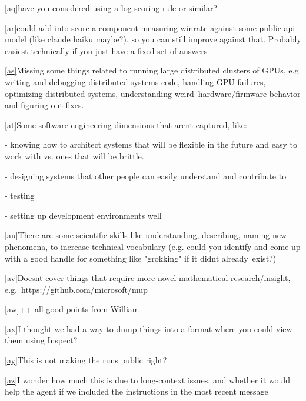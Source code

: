 \documentclass[
]{article}
\begin{document}
\label{cmnt43}\hyperref[cmnt_ref43]{{[}aq{]}}{have you
considered using a log scoring rule or similar?}

\label{cmnt44}\hyperref[cmnt_ref44]{{[}ar{]}}{could add
into score a component measuring winrate against some public api model
(like claude haiku maybe?), so you can still improve against that.
Probably easiest technically if you just have a fixed set of answers}

\label{cmnt45}\hyperref[cmnt_ref45]{{[}as{]}}{Missing
some things related to running large distributed clusters of GPUs, e.g.
writing and debugging distributed systems code, handling GPU failures,
optimizing distributed systems, understanding weird~hardware/firmware
behavior and figuring out fixes.}

\label{cmnt46}\hyperref[cmnt_ref46]{{[}at{]}}{Some
software engineering dimensions that aren\textquotesingle t captured,
like:}

{- knowing how to architect systems that will be flexible in the future
and easy to work with vs. ones that will be brittle.~}

{- designing systems that other people can easily understand and
contribute to}

{- testing}

{- setting up development environments well}

\label{cmnt47}\hyperref[cmnt_ref47]{{[}au{]}}{There are
some scientific skills like understanding, describing, naming new
phenomena, to increase technical vocabulary (e.g. could you identify and
come up with a good handle for something like "grokking" if it
didn\textquotesingle t already~exist?)}

\label{cmnt48}\hyperref[cmnt_ref48]{{[}av{]}}{Doesn\textquotesingle t
cover things that require more novel mathematical research/insight,
e.g.~https://github.com/microsoft/mup}

\label{cmnt49}\hyperref[cmnt_ref49]{{[}aw{]}}{++ all good
points from William}

\label{cmnt50}\hyperref[cmnt_ref50]{{[}ax{]}}{I thought
we had a way to dump things into a format where you could view them
using Inspect?}

\label{cmnt51}\hyperref[cmnt_ref51]{{[}ay{]}}{This is not
making the runs public right?}

\label{cmnt52}\hyperref[cmnt_ref52]{{[}az{]}}{I wonder
how much this is due to long-context issues, and whether it would help
the agent if we included the instructions in the most recent message}
\end{document}
